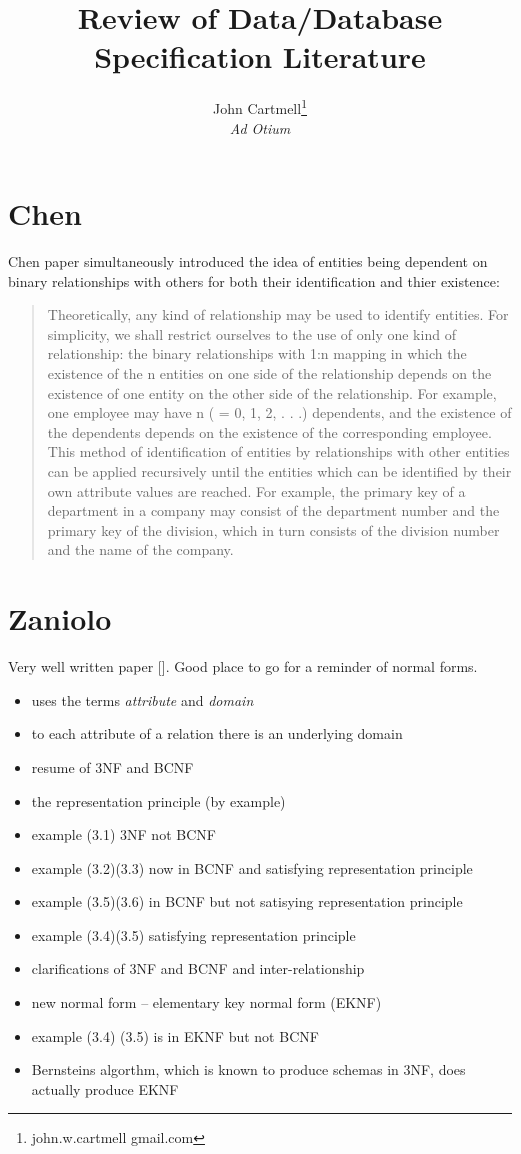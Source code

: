 \documentclass[11pt,a4paper]{scrartcl}
\title{Review of Data/Database Specification Literature}
\author{John Cartmell\footnote{john.w.cartmell gmail.com}\\ \normalsize{\textit{Ad Otium}}}
\begin{document}
\maketitle

\section{Chen}
Chen paper simultaneously introduced the idea of entities being dependent on binary relationships 
with others for both their identification and thier existence:
\begin{quote}
Theoretically, any kind of relationship may be used to identify entities. For
simplicity, we shall restrict ourselves to the use of only one kind of relationship:
the binary relationships with 1:n mapping in which the existence of the n entities
on one side of the relationship depends on the existence of one entity on the other
side of the relationship. For example, one employee may have n ( = 0, 1, 2, . . .)
dependents, and the existence of the dependents depends on the existence of the
corresponding employee.
This method of identification of entities by relationships with other entities can
be applied recursively until the entities which can be identified by their own attribute
values are reached. For example, the primary key of a department in a
company may consist of the department number and the primary key of the
division, which in turn consists of the division number and the name of the company.
\end{quote}

\section{Zaniolo}
Very well written paper [\cite{zaniolo1982}]. Good place to go for a reminder of normal forms.
\begin{itemize}
\item uses the terms \textit{attribute} and \textit{domain} 
\item to each attribute of a relation there is an underlying domain
\item resume of 3NF and BCNF
\item the representation principle (by example)
\item example (3.1) 3NF not BCNF
\item example (3.2)(3.3) now in BCNF and satisfying representation principle
\item example (3.5)(3.6) in BCNF but not satisying representation principle
\item example (3.4)(3.5) satisfying representation principle
\item clarifications of 3NF and BCNF and inter-relationship
\item new normal form -- elementary key normal form (EKNF)
\item example (3.4) (3.5) is in EKNF but not BCNF
\item Bernsteins algorthm, which is known to produce schemas in 3NF, does actually produce EKNF
\end{itemize}
\end{document}
